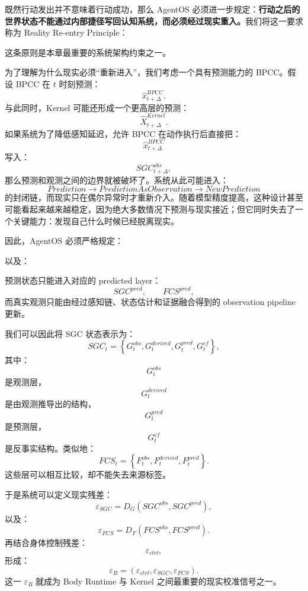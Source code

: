 既然行动发出并不意味着行动成功，那么 AgentOS 必须进一步规定：\textbf{行动之后的世界状态不能通过内部捷径写回认知系统，而必须经过现实重入。}我们将这一要求称为 Reality Re-entry Principle：

\begin{statementbox}
\centering
{}
\end{statementbox}

这条原则是本章最重要的系统架构约束之一。

为了理解为什么现实必须``重新进入''，我们考虑一个具有预测能力的 BPCC。假设 BPCC 在 $t$ 时刻预测：
\[
\hat{x}_{t+\Delta}^{BPCC}.
\]
与此同时，Kernel 可能还形成一个更高层的预测：
\[
\hat{X}_{t+\Delta}^{Kernel}.
\]
如果系统为了降低感知延迟，允许 BPCC 在动作执行后直接把：
\[
\hat{x}_{t+\Delta}^{BPCC}
\]
写入：
\[
SGC^{obs}_{t+\Delta},
\]
那么预测和观测之间的边界就被破坏了。系统从此可能进入：
\[
Prediction
\rightarrow
PredictionAsObservation
\rightarrow
NewPrediction
\]
的封闭链，而现实只在偶尔异常时才重新介入。随着模型精度提高，这种设计甚至可能看起来越来越稳定，因为绝大多数情况下预测与现实接近；但它同时失去了一个关键能力：发现自己什么时候已经脱离现实。

因此，AgentOS 必须严格规定：
\begin{statementbox}
\centering
{}
\end{statementbox}
以及：
\begin{statementbox}
\centering
{}
\end{statementbox}
预测状态只能进入对应的 predicted layer：
\[
SGC^{pred},\qquad FCS^{pred},
\]
而真实观测只能由经过感知链、状态估计和证据融合得到的 observation pipeline 更新。

我们可以因此将 SGC 状态表示为：
\[
SGC_t
=
\left\{
G_t^{obs},
G_t^{derived},
G_t^{pred},
G_t^{cf}
\right\},
\]
其中：
\[
G_t^{obs}
\]
是观测层，
\[
G_t^{derived}
\]
是由观测推导出的结构，
\[
G_t^{pred}
\]
是预测层，
\[
G_t^{cf}
\]
是反事实结构。类似地：
\[
FCS_t
=
\left\{
F_t^{obs},
F_t^{derived},
F_t^{pred}
\right\}.
\]
这些层可以相互比较，却不能失去来源标签。

于是系统可以定义现实残差：
\[
\varepsilon_{SGC}
=
D_G
\left(
SGC^{obs},
SGC^{pred}
\right),
\]
以及：
\[
\varepsilon_{FCS}
=
D_F
\left(
FCS^{obs},
FCS^{pred}
\right).
\]
再结合身体控制残差：
\[
\varepsilon_{ctrl},
\]
形成：
\[
\boxed{
\varepsilon_B
=
\left(
\varepsilon_{ctrl},
\varepsilon_{SGC},
\varepsilon_{FCS}
\right).
}
\]
这一 $\varepsilon_B$ 就成为 Body Runtime 与 Kernel 之间最重要的现实校准信号之一。

